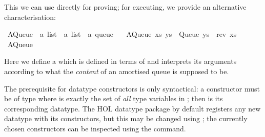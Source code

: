 \begin{isabellebody}
\endisatagquote
{\isafoldquote}%
%
\isadelimquote
%
\endisadelimquote
%
\begin{isamarkuptext}%
\noindent This we can use directly for proving;  for executing,
  we provide an alternative characterisation:%
\end{isamarkuptext}%
\isamarkuptrue%
%
\isadelimquote
%
\endisadelimquote
%
\isatagquote
{}\isamarkupfalse%
\ AQueue\ {\isacharcolon}{\isacharcolon}\ {\isachardoublequoteopen}{\isacharprime}a\ list\ {\isasymRightarrow}\ {\isacharprime}a\ list\ {\isasymRightarrow}\ {\isacharprime}a\ queue{\isachardoublequoteclose}\ \isanewline
\ \ {\isachardoublequoteopen}AQueue\ xs\ ys\ {\isacharequal}\ Queue\ {\isacharparenleft}ys\ {\isacharat}\ rev\ xs{\isacharparenright}{\isachardoublequoteclose}\isanewline
\isanewline
{}\isamarkupfalse%
\ AQueue%
\endisatagquote
{\isafoldquote}%
%
\isadelimquote
%
\endisadelimquote
%
\begin{isamarkuptext}%
\noindent Here we define a   which
  is defined in terms of  and interprets its arguments
  according to what the \emph{content} of an amortised queue is supposed
  to be.

  The prerequisite for datatype constructors is only syntactical: a
  constructor must be of type  where  is exactly the set of \emph{all} type variables in
  \isa{{\isasymtau}}; then \isa{{\isasymkappa}} is its corresponding datatype.  The
  HOL datatype package by default registers any new datatype with its
  constructors, but this may be changed using \hyperlink{command.code-datatype}{\mbox{}}; the currently chosen constructors can be inspected
  using the \hyperlink{command.print-codesetup}{\mbox{}} command.


\end{isamarkuptext}
\end{isabellebody}
